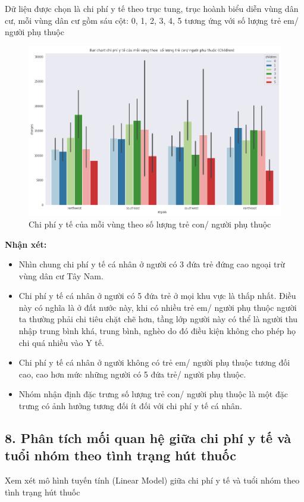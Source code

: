 \documentclass{article}
\begin{document}
	Dữ liệu được chọn là chi phí y tế theo trục tung, trục hoành biểu diễn vùng dân cư, mỗi vùng dân cư gồm sáu cột: 0, 1, 2, 3, 4, 5 tương ứng với số lượng trẻ em/ người phụ thuộc
	\begin{figure}[H]
		\centering
		\includegraphics[width=1\textwidth]{images/bar_chart_medical_charges_region_children.png}
		\caption{Chi phí y tế của mỗi vùng theo số lượng trẻ con/ người phụ thuộc}
		\label{fig:writing-thesis-bar-chart-medical-charges-region-children}
	\end{figure}
	\textbf{Nhận xét:} 
	\begin{itemize}
		\item Nhìn chung chi phí y tế cá nhân ở người có 3 đứa trẻ đứng cao ngoại trừ vùng dân cư Tây Nam. 
		\item Chi phí y tế cá nhân ở người có 5 đứa trẻ ở mọi khu vực là thấp nhất. Điều này có nghĩa là ở đất nước này, khi có nhiều trẻ em/ người phụ thuộc người ta thường phải chi tiêu chặt chẽ hơn, tầng lớp người này có thể là người thu nhập trung bình khá, trung bình, nghèo do đó điều kiện không cho phép họ chi quá nhiều vào Y tế.
		\item Chi phí y tế cá nhân ở người không có trẻ em/ người phụ thuộc tương đối cao, cao hơn mức những người có 5 đứa trẻ/ người phụ thuộc.
		\item Nhóm nhận định đặc trưng số lượng trẻ con/ người phụ thuộc là một đặc trưng có ảnh hưởng tương đối ít đối với chi phí y tế cá nhân.
	\end{itemize}
	
	\subsection{8. Phân tích mối quan hệ giữa chi phí y tế và tuổi nhóm theo tình trạng hút thuốc}
	\qquad Xem xét mô hình tuyến tính (Linear Model) giữa  chi phí y tế và tuổi nhóm theo tình trạng hút thuốc
	
\end{document}

